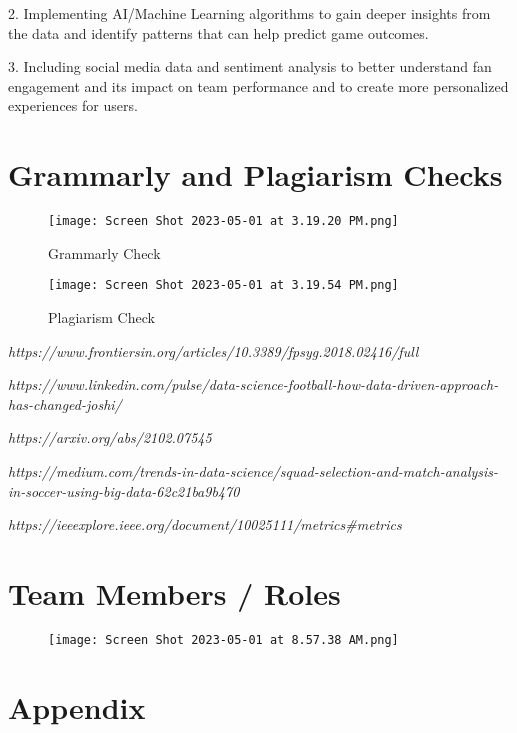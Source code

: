 \documentclass[lettersize]{IEEEtran}
\begin{document}
2. Implementing AI/Machine Learning algorithms to gain deeper insights from the data and identify patterns that can help predict game outcomes.

3. Including social media data and sentiment analysis to better understand fan engagement and its impact on team performance and to create more personalized experiences for users.

\section{\textbf{Grammarly and Plagiarism Checks}}
\begin{figure}[H]
    \centering
    \texttt{[image: Screen Shot 2023-05-01 at 3.19.20 PM.png]}
    \caption{Grammarly Check}
    \label{fig:image_label}
\end{figure}

\begin{figure}[H]
    \centering
    \texttt{[image: Screen Shot 2023-05-01 at 3.19.54 PM.png]}
    \caption{Plagiarism Check}
    \label{fig:image_label}
\end{figure}

\begin{thebibliography}{1}


{\it https://www.frontiersin.org/articles/10.3389/fpsyg.2018.02416/full
}

{\it 
https://www.linkedin.com/pulse/data-science-football-how-data-driven-approach-has-changed-joshi/}

{\it 
https://arxiv.org/abs/2102.07545}

{\it 
https://medium.com/trends-in-data-science/squad-selection-and-match-analysis-in-soccer-using-big-data-62c21ba9b470
}

{\it 
https://ieeexplore.ieee.org/document/10025111/metrics#metrics
}

\end{thebibliography}

\section{\textbf{Team Members / Roles}}
\begin{figure}[H]
    \centering
    \texttt{[image: Screen Shot 2023-05-01 at 8.57.38 AM.png]}
\end{figure}

\newpage

\section{\textbf{Appendix}}


\end{document}
